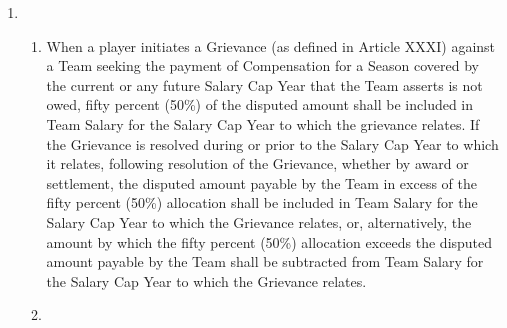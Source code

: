 \documentclass[
]{book}
\providecommand{\tightlist}{%
  \setlength{\itemsep}{0pt}\setlength{\parskip}{0pt}}
\begin{document}
\begin{enumerate}
\begin{enumerate}
\begin{enumerate}
      \begin{enumerate}
      \def\labelenumiv{(\Alph{enumiv})}
      \item
        \begin{enumerate}
        \def\labelenumv{(\arabic{enumv})}
        \tightlist
        \item
          When a player initiates a Grievance (as defined in Article XXXI) against a Team seeking the payment of Compensation for a Season covered by the current or any future Salary Cap Year that the Team asserts is not owed, fifty percent (50\%) of the disputed amount shall be included in Team Salary for the Salary Cap Year to which the grievance relates. If the Grievance is resolved during or prior to the Salary Cap Year to which it relates, following resolution of the Grievance, whether by award or settlement, the disputed amount payable by the Team in excess of the fifty percent (50\%) allocation shall be included in Team Salary for the Salary Cap Year to which the Grievance relates, or, alternatively, the amount by which the fifty percent (50\%) allocation exceeds the disputed amount payable by the Team shall be subtracted from Team Salary for the Salary Cap Year to which the Grievance relates.
        \item

\end{enumerate}
\end{enumerate}
\end{enumerate}
\end{enumerate}
\end{enumerate}
\end{document}
